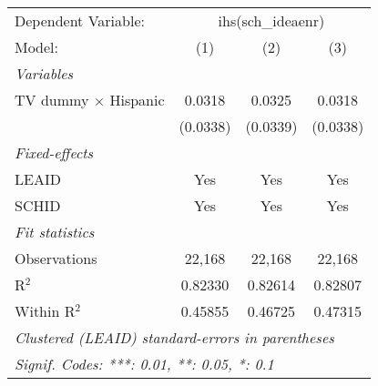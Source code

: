 \begin{tabular}{lccc}
\tabularnewline\midrule\midrule
Dependent Variable:&\multicolumn{3}{c}{ihs(sch\_ideaenr)}\\
Model:&(1) & (2) & (3)\\
\midrule \emph{Variables}&   &   &  \\
TV dummy $\times$ Hispanic & 0.0318 & 0.0325 & 0.0318\\
  &(0.0338) & (0.0339) & (0.0338)\\
\midrule \emph{Fixed-effects}&   &   &  \\
LEAID & Yes & Yes & Yes\\
SCHID & Yes & Yes & Yes\\
\midrule \emph{Fit statistics}&  & & \\
Observations & 22,168&22,168&22,168\\
R$^2$ & 0.82330&0.82614&0.82807\\
Within R$^2$ & 0.45855&0.46725&0.47315\\
\midrule\midrule\multicolumn{4}{l}{\emph{Clustered (LEAID) standard-errors in parentheses}}\\
\multicolumn{4}{l}{\emph{Signif. Codes: ***: 0.01, **: 0.05, *: 0.1}}\\
\end{tabular}


